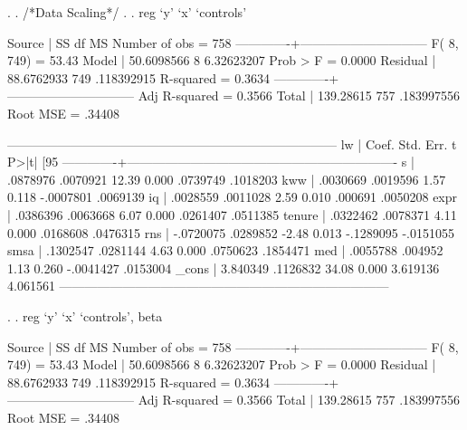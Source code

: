 \documentclass[12pt]{article}
\begin{document}
\begin{stlog}
  .   
. /*Data Scaling*/
. 
. reg `y' `x' `controls'

      Source |       SS       df       MS              Number of obs =     758
-------------+------------------------------           F(  8,   749) =   53.43
       Model |  50.6098566     8  6.32623207           Prob > F      =  0.0000
    Residual |  88.6762933   749  .118392915           R-squared     =  0.3634
-------------+------------------------------           Adj R-squared =  0.3566
       Total |   139.28615   757  .183997556           Root MSE      =  .34408

------------------------------------------------------------------------------
          lw |      Coef.   Std. Err.      t    P>|t|     [95%
-------------+----------------------------------------------------------------
           s |   .0878976   .0070921    12.39   0.000     .0739749    .1018203
         kww |   .0030669   .0019596     1.57   0.118    -.0007801    .0069139
          iq |   .0028559   .0011028     2.59   0.010      .000691    .0050208
        expr |   .0386396   .0063668     6.07   0.000     .0261407    .0511385
      tenure |   .0322462   .0078371     4.11   0.000     .0168608    .0476315
         rns |  -.0720075   .0289852    -2.48   0.013    -.1289095   -.0151055
        smsa |   .1302547   .0281144     4.63   0.000     .0750623    .1854471
         med |   .0055788    .004952     1.13   0.260    -.0041427    .0153004
       _cons |   3.840349   .1126832    34.08   0.000     3.619136    4.061561
------------------------------------------------------------------------------

.   
. reg `y' `x' `controls', beta

      Source |       SS       df       MS              Number of obs =     758
-------------+------------------------------           F(  8,   749) =   53.43
       Model |  50.6098566     8  6.32623207           Prob > F      =  0.0000
    Residual |  88.6762933   749  .118392915           R-squared     =  0.3634
-------------+------------------------------           Adj R-squared =  0.3566
       Total |   139.28615   757  .183997556           Root MSE      =  .34408


\end{stlog}
\end{document}
